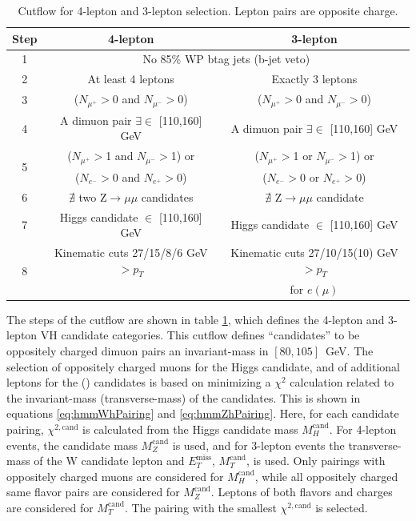 \begin{table}[ht!]
 \begin{center}
\begin{tabular}{c c  c}\toprule
Step & 4-lepton & 3-lepton \\\midrule
1 & \multicolumn{2}{c}{No 85\% WP btag jets (b-jet veto)}           \\\midrule
2 & At least 4 leptons                                & Exactly 3 leptons\\\midrule
3 & ($N_{\mu^+}>$0 and $N_{\mu^-}>$0)                 & ($N_{\mu^+}>$0 and $N_{\mu^-}>$0) \\\midrule
4 & A dimuon pair $\exists\in$ [110,160] GeV                    & A dimuon pair $\exists\in$ [110,160] GeV \\\midrule
\multirow{2}{*}{5} & ($N_{\mu^+}>$1 and $N_{\mu^-}>$1) or              & ($N_{\mu^+}>$1 or $N_{\mu^-}>$1) or \\
  & ($N_{e^-}>$0 and $N_{e^+}>$0)                    & ($N_{e^-}>$0 or $N_{e^+}>$0)  \\\midrule
6 & $\nexists$ two Z$\to\mu\mu$ candidates                        & $\nexists$ Z$\to\mu\mu$ candidate  \\\midrule
7 & Higgs candidate $\in$ [110,160] GeV                  & Higgs candidate $\in$ [110,160] GeV \\\midrule
\multirow{2}{*}{8} & Kinematic cuts 27/15/8/6 GeV $>p_T$                    & Kinematic cuts 27/10/15(10) GeV $>p_T$ \\
  &                                                        & for $e(\mu)$ \\
\bottomrule\end{tabular}
 \end{center}
 \caption{Cutflow for 4-lepton and 3-lepton selection. Lepton pairs are opposite charge.}
\label{tab:hmmEv}
\end{table}

The steps of the cutflow are shown in table \ref{tab:hmmEv}, which defines the 4-lepton and 3-lepton VH candidate categories.
This cutflow defines ``\Z candidates'' to be oppositely charged dimuon pairs an invariant-mass in $[80,105]$~GeV.
The selection of oppositely charged muons for the Higgs candidate, and of additional leptons for the \Z(\W) candidates is based on minimizing a $\chi^2$ calculation related to the invariant-mass (transverse-mass) of the candidates.
This is shown in equations \ref{eq:hmmWhPairing} and \ref{eq:hmmZhPairing}.
Here, for each candidate pairing, $\chi^{2,\text{cand}}$ is calculated from the Higgs candidate mass $M_H^\text{cand}$.
For 4-lepton events, the \Z candidate mass $M_Z^\text{cand}$ is used, and for 3-lepton events the transverse-mass of the W candidate lepton and $E_T^\text{miss}$, $M_T^\text{cand}$, is used.
Only pairings with oppositely charged muons are considered for $M_H^\text{cand}$, while all oppositely charged same flavor pairs are considered for $M_Z^\text{cand}$.
Leptons of both flavors and charges are considered for $M_T^\text{cand}$.
The pairing with the smallest $\chi^{2,\text{cand}}$ is selected.

